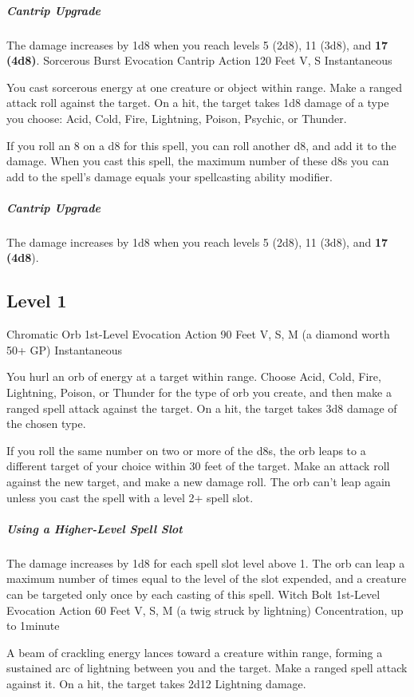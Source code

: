 \documentclass[letterpaper,openany,oneside,twocolumn]{book}
\begin{document}
\subparagraph*{Cantrip Upgrade} The damage increases by 1d8 when you reach levels 5 (2d8), 11 (3d8), and \textbf{17 (4d8)}.
\DndSpellHeader
  {Sorcerous Burst}
  {Evocation Cantrip}
  {Action}
  {120 Feet}
  {V, S}
  {Instantaneous}

You cast sorcerous energy at one creature or object within range. Make a ranged attack roll against the target. On a hit, the target takes 1d8 damage of a type you choose: Acid, Cold, Fire, Lightning, Poison, Psychic, or Thunder.

If you roll an 8 on a d8 for this spell, you can roll another d8, and add it to the damage. When you cast this spell, the maximum number of these d8s you can add to the spell's damage equals your spellcasting ability modifier.

\subparagraph*{Cantrip Upgrade} The damage increases by 1d8 when you reach levels 5 (2d8), 11 (3d8), and \textbf{17 (4d8}).

\subsection*{Level 1}
\DndSpellHeader
  {Chromatic Orb}
  {1st-Level Evocation}
  {Action}
  {90 Feet}
  {V, S, M (a diamond worth 50+ GP)}
  {Instantaneous}

You hurl an orb of energy at a target within range. Choose Acid, Cold, Fire, Lightning, Poison, or Thunder for the type of orb you create, and then make a ranged spell attack against the target. On a hit, the target takes 3d8 damage of the chosen type.

If you roll the same number on two or more of the d8s, the orb leaps to a different target of your choice within 30 feet of the target. Make an attack roll against the new target, and make a new damage roll. The orb can't leap again unless you cast the spell with a level 2+ spell slot.

\subparagraph*{Using a Higher-Level Spell Slot} The damage increases by 1d8 for each spell slot level above 1. The orb can leap a maximum number of times equal to the level of the slot expended, and a creature can be targeted only once by each casting of this spell.
\DndSpellHeader
  {Witch Bolt}
  {1st-Level Evocation}
  {Action}
  {60 Feet}
  {V, S, M (a twig struck by lightning)}
  {Concentration, up to 1minute}

A beam of crackling energy lances toward a creature within range, forming a sustained arc of lightning between you and the target. Make a ranged spell attack against it. On a hit, the target takes 2d12 Lightning damage.
\end{document}
